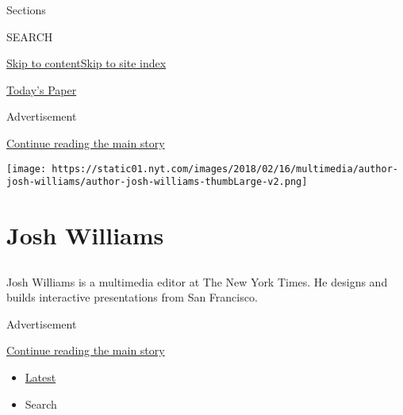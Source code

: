 Sections

SEARCH

\protect\hyperlink{site-content}{Skip to
content}\protect\hyperlink{site-index}{Skip to site index}

\href{https://myaccount.nytimes.com/auth/login?response_type=cookie\&client_id=vi}{}

\href{https://www.nytimes.com/section/todayspaper}{Today's Paper}

Advertisement

\protect\hyperlink{after-top}{Continue reading the main story}

\texttt{[image: https://static01.nyt.com/images/2018/02/16/multimedia/author-josh-williams/author-josh-williams-thumbLarge-v2.png]}

\hypertarget{josh-williams}{%
\section{Josh Williams}\label{josh-williams}}

\subsection{}

Josh Williams is a multimedia editor at The New York Times. He designs
and builds interactive presentations from San Francisco.

Advertisement

\protect\hyperlink{after-mid1}{Continue reading the main story}

\begin{itemize}
\tightlist
\item
  \protect\hyperlink{stream-panel}{Latest}
\item
  Search
\end{itemize}

